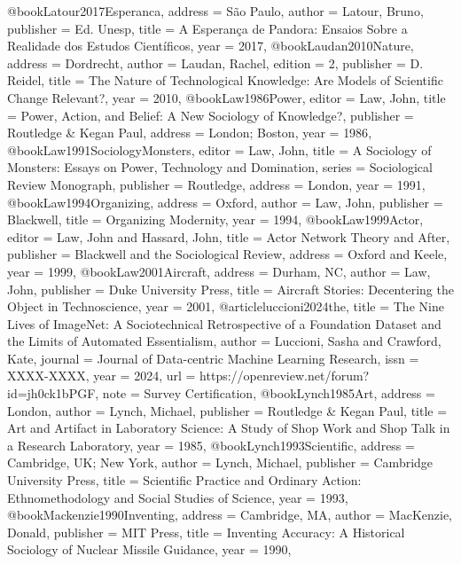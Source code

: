 @book{Latour2017Esperanca,
  address   = {São Paulo},
  author    = {Latour, Bruno},
  publisher = {Ed. Unesp},
  title     = {{A Esperança de Pandora: Ensaios Sobre a Realidade dos Estudos Científicos}},
  year      = {2017},
}
@book{Laudan2010Nature,
  address   = {Dordrecht},
  author    = {Laudan, Rachel},
  edition   = {2},
  publisher = {D. Reidel},
  title     = {{The Nature of Technological Knowledge: Are Models of Scientific Change Relevant?}},
  year      = {2010},
}
@book{Law1986Power,
  editor    = {Law, John},
  title     = {{Power, Action, and Belief: A New Sociology of Knowledge?}},
  publisher = {Routledge \& Kegan Paul},
  address   = {London; Boston},
  year      = {1986},
}
@book{Law1991SociologyMonsters,
  editor    = {Law, John},
  title     = {{A Sociology of Monsters: Essays on Power, Technology and Domination}},
  series    = {{Sociological Review Monograph}},
  publisher = {Routledge},
  address   = {London},
  year      = {1991},
}
@book{Law1994Organizing,
  address   = {Oxford},
  author    = {Law, John},
  publisher = {Blackwell},
  title     = {{Organizing Modernity}},
  year      = {1994},
}
@book{Law1999Actor,
  editor    = {Law, John and Hassard, John},
  title     = {{Actor Network Theory and After}},
  publisher = {Blackwell and the Sociological Review},
  address   = {Oxford and Keele},
  year      = {1999},
}
@book{Law2001Aircraft,
  address   = {Durham, NC},
  author    = {Law, John},
  publisher = {Duke University Press},
  title     = {{Aircraft Stories: Decentering the Object in Technoscience}},
  year      = {2001},
}
@article{luccioni2024the,
  title   = {{The Nine Lives of ImageNet: A Sociotechnical Retrospective of a Foundation Dataset and the Limits of Automated Essentialism}},
  author  = {Luccioni, Sasha and Crawford, Kate},
  journal = {{Journal of Data-centric Machine Learning Research}},
  issn    = {XXXX-XXXX},
  year    = {2024},
  url     = {https://openreview.net/forum?id=jh0ck1bPGF},
  note    = {Survey Certification},
}
@book{Lynch1985Art,
  address   = {London},
  author    = {Lynch, Michael},
  publisher = {Routledge \& Kegan Paul},
  title     = {{Art and Artifact in Laboratory Science: A Study of Shop Work and Shop Talk in a Research Laboratory}},
  year      = {1985},
}
@book{Lynch1993Scientific,
  address   = {Cambridge, UK; New York},
  author    = {Lynch, Michael},
  publisher = {Cambridge University Press},
  title     = {{Scientific Practice and Ordinary Action: Ethnomethodology and Social Studies of Science}},
  year      = {1993},
}
@book{Mackenzie1990Inventing,
  address   = {Cambridge, MA},
  author    = {MacKenzie, Donald},
  publisher = {MIT Press},
  title     = {{Inventing Accuracy: A Historical Sociology of Nuclear Missile Guidance}},
  year      = {1990},
}
